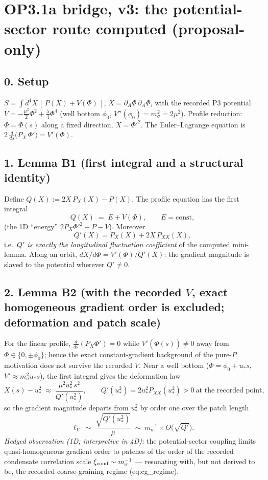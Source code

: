 \section*{OP3.1a bridge, v3: the potential-sector route computed
(proposal-only)}

\subsection*{0. Setup}
$S=\int d^4X\,[\,P(X)+V(\Phi)\,]$, $X=\partial_A\Phi\,
\partial_A\Phi$, with the recorded P3 potential
$V=-\tfrac{\mu^2}{2}\Phi^2+\tfrac{\lambda}{4}\Phi^4$
(well bottom $\phi_0$, $V''(\phi_0)=m_\sigma^2=2\mu^2$).
Profile reduction: $\Phi=\Phi(s)$ along a fixed direction,
$X=\Phi'^2$.
The Euler--Lagrange equation is
$2\,\tfrac{d}{ds}\bigl(P_X\,\Phi'\bigr)=V'(\Phi)$.

\subsection*{1. Lemma B1 (first integral and a structural
identity)}
Define $Q(X):=2X\,P_X(X)-P(X)$.
The profile equation has the first integral
\[
Q(X)\;=\;E+V(\Phi),\qquad E=\mathrm{const},
\]
(the 1D ``energy'' $2P_X\Phi'^2-P-V$).
Moreover
\[
Q'(X)=P_X(X)+2X\,P_{XX}(X),
\]
i.e.\ \emph{$Q'$ is exactly the longitudinal fluctuation
coefficient} of the computed mini-lemma.
Along an orbit, $dX/d\Phi=V'(\Phi)/Q'(X)$: the gradient magnitude
is slaved to the potential wherever $Q'\neq0$.

\subsection*{2. Lemma B2 (with the recorded $V$, exact homogeneous
gradient order is excluded; deformation and patch scale)}
For the linear profile, $\tfrac{d}{ds}(P_X\Phi')=0$ while
$V'(\bar\Phi(s))\neq0$ away from $\Phi\in\{0,\pm\phi_0\}$;
hence the exact constant-gradient background of the pure-$P$
motivation does not survive the recorded $V$.
Near a well bottom ($\Phi=\phi_0+u_*s$, $V'\approx m_\sigma^2
u_*s$), the first integral gives the deformation law
\[
X(s)-u_*^2\;\approx\;\frac{\mu^2u_*^2\,s^2}{Q'(u_*^2)},
\qquad Q'(u_*^2)=2u_*^2P_{XX}(u_*^2)>0
\ \text{at the recorded point},
\]
so the gradient magnitude departs from $u_*^2$ by order one over
the patch length
\[
\ell_V\;\sim\;\frac{\sqrt{Q'(u_*^2)}}{\mu}\;\sim\;m_\sigma^{-1}
\times O\!\bigl(\sqrt{Q'}\bigr).
\]
\emph{Hedged observation (1D; interpretive in 4D):} the
potential-sector coupling limits quasi-homogeneous gradient order
to patches of the order of the recorded condensate correlation
scale $\xi_{\rm cond}\sim m_\sigma^{-1}$ --- resonating with, but
not derived to be, the recorded coarse-graining regime
(eq:cg\_regime).

